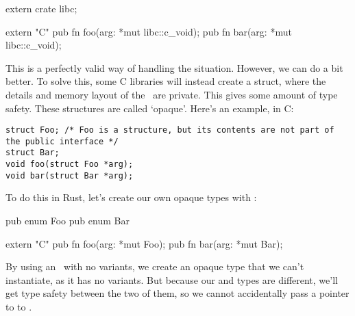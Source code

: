 \begin{rustc}
extern crate libc;

extern "C" {
    pub fn foo(arg: *mut libc::c_void);
    pub fn bar(arg: *mut libc::c_void);
}
\end{rustc}

This is a perfectly valid way of handling the situation. However, we can do a bit better. To solve this, some C 
libraries will instead create a struct, where the details and memory layout of the \struct\ are private. This gives 
some amount of type safety. These structures are called ‘opaque’. Here’s an example, in C:

\begin{verbatim}
struct Foo; /* Foo is a structure, but its contents are not part of the public interface */
struct Bar;
void foo(struct Foo *arg);
void bar(struct Bar *arg);
\end{verbatim}

To do this in Rust, let’s create our own opaque types with \enum:

\begin{rustc}
pub enum Foo {}
pub enum Bar {}

extern "C" {
    pub fn foo(arg: *mut Foo);
    pub fn bar(arg: *mut Bar);
}
\end{rustc}

By using an \enum\ with no variants, we create an opaque type that we can’t instantiate, as it has no variants. But 
because our  and  types are different, we’ll get type safety between the two of them, so we cannot 
accidentally pass a pointer to  to .

